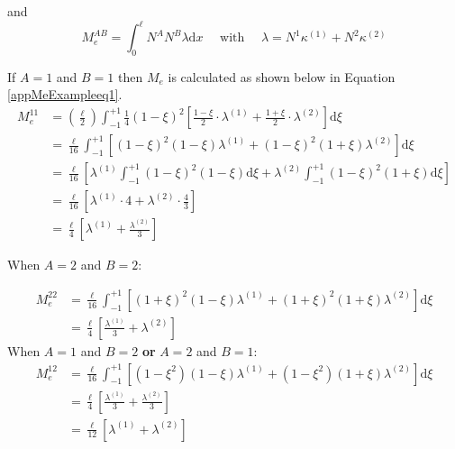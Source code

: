 and
\begin{equation}
M_e^{AB} = \int_0^\ell N^A N^B \lambda \text{d}x \quad\text{ with }\quad \lambda = N^1 \kappa^{(1)} + N^2 \kappa^{(2)}
\end{equation}

If $A=1$ and $B=1$ then $M_e$ is calculated as shown below in Equation \ref{appMeExampleeq1}.
\begin{equation} \label{appMeExampleeq1}
\begin{aligned}
M_e^{11} &= \left(\frac{\ell}{2}\right) \int_{-1}^{+1} \frac{1}{4} (1-\xi)^2\left[ \frac{1-\xi}{2} \cdot \lambda^{(1)} + \frac{1+\xi}{2} \cdot \lambda^{(2)} \right] \text{d} \xi \\
&= \frac{\ell}{16} \int_{-1}^{+1} \left[
	(1-\xi)^2(1-\xi) \lambda^{(1)}
	+ (1-\xi)^2(1+\xi) \lambda^{(2)}
\right] \text{d}\xi \\
&= \frac{\ell}{16} \left[
	\lambda^{(1)} \int_{-1}^{+1} (1-\xi)^2(1-\xi) \text{d}\xi
	+ \lambda^{(2)} \int_{-1}^{+1} (1-\xi)^2(1+\xi) \text{d}\xi
\right] \\
&= \frac{\ell}{16} \left[
	\lambda^{(1)} \cdot 4
	+ \lambda^{(2)} \cdot \frac{4}{3}
\right] \\
&= \frac{\ell}{4} \left[
	\lambda^{(1)} + \frac{\lambda^{(2)}}{3}
\right]
\end{aligned}
\end{equation}
 
 When $A=2$ and $B=2$:

\begin{equation}\label{appMeExampleeq2}
\begin{aligned}
M_e^{22} &= \frac{\ell}{16} \int_{-1}^{+1} \left[
	(1+\xi)^2(1-\xi)\lambda^{(1)} + (1+\xi)^2(1+\xi)\lambda^{(2)}
\right] \text{d}\xi \\
&= \frac{\ell}{4} \left[
	\frac{\lambda^{(1)}}{3}
	+ \lambda^{(2)}
\right]
\end{aligned}
\end{equation}
 When $A=1$ and $B=2$ \textbf{or} $A=2$ and $B=1$:
\begin{equation}\label{appMeExampleeq3}
\begin{aligned}
M_e^{12} &= \frac{\ell}{16} \int_{-1}^{+1} \left[
	(1-\xi^2)(1-\xi) \lambda^{(1)}
	+ (1-\xi^2)(1+\xi)\lambda^{(2)}
\right] \text{d} \xi \\
&= \frac{\ell}{4}\left[
	\frac{\lambda^{(1)}}{3}
	+ \frac{\lambda^{(2)}}{3}
\right] \\
&= \frac{\ell}{12}\left[
	\lambda^{(1)}
	+ \lambda^{(2)}
\right] \\
\end{aligned}
\end{equation}

